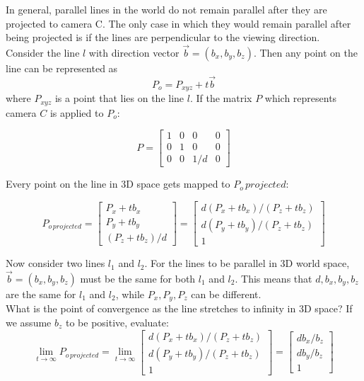 \documentclass[a4paper,10pt]{scrartcl}
\begin{document}
In general, parallel lines in the world do not remain parallel after they are projected to camera C. The only
case in which they would remain parallel after being projected is if the lines are perpendicular to the viewing
direction. \\

Consider the line $l$ with direction vector $\vec b = (b_x, b_y, b_z)$. Then any point on the line can be represented as
\[ P_o = P_{xyz} + t\vec b\] where $P_{xyz}$ is a point that lies on the line $l$. If the matrix $P$ which represents
camera $C$ is applied to $P_o$:

\[ P = \begin{bmatrix} 1 & 0 & 0 & 0 \\ 0 & 1 & 0 & 0 \\ 0 & 0 & 1/d & 0 \end{bmatrix}\]

Every point on the line in 3D space gets mapped to $P_o\,projected$:

\[ P_{o\,projected} = \begin{bmatrix} P_x + tb_x\\ P_y + tb_y\\ (P_z + tb_z)/d \end{bmatrix}= \begin{bmatrix}  d(P_x + tb_x)/(P_z + tb_z)\\ d(P_y + tb_y)/(P_z + tb_z)\\1 \end{bmatrix}\]

Now consider two lines $l_1$ and $l_2$. For the lines to be parallel in 3D world space, $\vec b = (b_x, b_y, b_z)$ 
must be the same for both $l_1$ and $l_2$. This means that $d, b_x, b_y, b_z$ are the same for $l_1$ and $l_2$, while
$P_x, P_y, P_z$ can be different.\\

What is the point of convergence as the line stretches to infinity in 3D space? If we assume $b_z$ to be positive, evaluate:
\[ \lim_{t \to \infty} P_{o\,projected} = \lim_{t \to \infty} \begin{bmatrix}  d(P_x + tb_x)/(P_z + tb_z)\\ d(P_y + tb_y)/(P_z + tb_z)\\1 \end{bmatrix} =
  \begin{bmatrix} db_x/b_z \\ db_y/b_z \\ 1\end{bmatrix}\]
  
\end{document}
